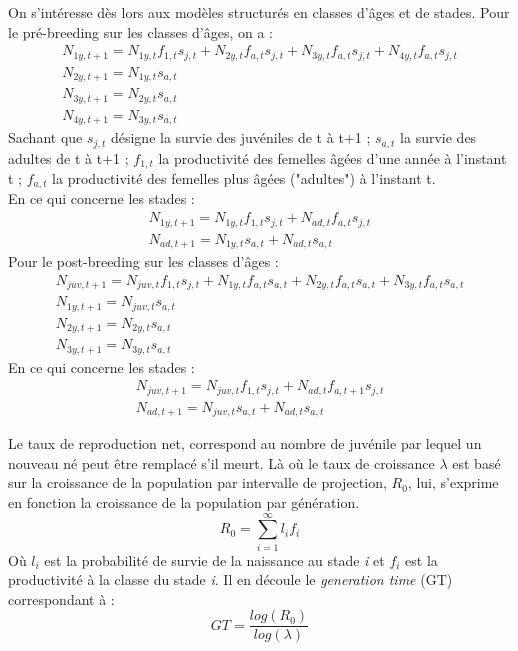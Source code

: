 \documentclass[12pt,a4paper]{article}
\begin{document}
On s'intéresse dès lors aux modèles structurés en classes d'âges et de stades. Pour le pré-breeding sur les classes d'âges, on a :
\begin{equation}
\begin{aligned}
N_{1y, t+1}=N_{1y, t}f_{1, t}s_{j, t}+N_{2y, t}f_{a, t}s_{j, t}+N_{3y, t}f_{a, t}s_{j, t}+N_{4y, t}f_{a, t}s_{j, t} \\
N_{2y, t+1}=N_{1y, t}s_{a, t} \\
N_{3y, t+1}=N_{2y, t}s_{a, t} \\
N_{4y, t+1}=N_{3y, t}s_{a, t}
\end{aligned}
\end{equation}
Sachant que $s_{j,t}$ désigne la survie des juvéniles de t à t+1 ; $s_{a, t}$ la survie des adultes de t à t+1 ; $f_{1, t}$ la productivité des femelles âgées d'une année à l'instant t ; $f_{a, t}$ la productivité des femelles plus âgées ("adultes") à l'instant t.\vspace*{0.5cm}\\
En ce qui concerne les stades :
\begin{equation}
\begin{aligned}
N_{1y, t+1}=N_{1y, t}f_{1, t}s_{j, t}+N_{ad, t}f_{a, t}s_{j, t} \\
N_{ad, t+1}=N_{1y, t}s_{a, t}+N_{ad, t}s_{a, t}
\end{aligned}
\end{equation}
Pour le post-breeding sur les classes d'âges :
\begin{equation}
\begin{aligned}
N_{juv, t+1}=N_{juv, t}f_{1, t}s_{j, t}+N_{1y, t}f_{a, t}s_{a, t}+N_{2y, t}f_{a, t}s_{a, t}+N_{3y, t}f_{a, t}s_{a, t} \\
N_{1y, t+1}=N_{juv, t}s_{a, t} \\
N_{2y, t+1}=N_{2y, t}s_{a, t} \\
N_{3y, t+1}=N_{3y, t}s_{a, t}
\end{aligned}
\end{equation}
En ce qui concerne les stades :
\begin{equation}
\begin{aligned}
N_{juv, t+1}=N_{juv, t}f_{1, t}s_{j, t}+N_{ad, t}f_{a, t+1}s_{j, t} \\
N_{ad, t+1}=N_{juv, t}s_{a, t}+N_{ad, t}s_{a, t}
\end{aligned}
\end{equation}

Le taux de reproduction net, correspond au nombre de juvénile par lequel un nouveau né peut être remplacé s'il meurt. Là où le taux de croissance $\lambda$ est basé sur la croissance de la population par intervalle de projection, $R_0$, lui, s'exprime en fonction la croissance de la population par génération.
\begin{equation}
R_{0}=\sum_{i=1}^{\infty}l_{i}f_{i}
\end{equation}
Où $l_i$ est la probabilité de survie de la naissance au stade \textit{i} et $f_i$ est la productivité à la classe du stade \textit{i}.
Il en découle le \textit{generation time} (GT) correspondant à : 
\begin{equation}
GT=\dfrac{log(R_0)}{log(\lambda)}
\end{equation}
\end{document}
